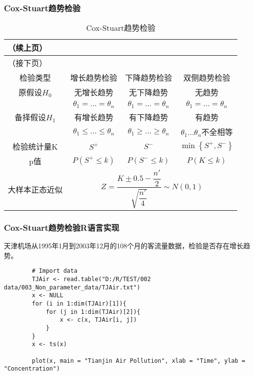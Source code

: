 \documentclass[UTF8]{ctexart}
\numberwithin{equation}{section}
\begin{document}
\subsubsection{Cox-Stuart趋势检验}

\begin{center}
    \begin{longtable}{cccc}
        \caption{Cox-Stuart趋势检验} \\ \toprule
        \endfirsthead
        \multicolumn{3}{l}{（续上页）} \\ \toprule
        \endhead
        \bottomrule
        \multicolumn{3}{l}{（接下页）} \\[2ex]
        \endfoot
        \bottomrule
        \endlastfoot
        检验类型 & 增长趋势检验 & 下降趋势检验 & 双侧趋势检验 \\
        \hline
        原假设$H_0$ & 无增长趋势 & 无下降趋势 & 无趋势 \\
         & $\theta_1 = \dots = \theta_n$ & $\theta_1 = \dots = \theta_n$ & $\theta_1 = \dots = \theta_n$ \\
        备择假设$H_1$ & 有增长趋势 & 有下降趋势 & 有趋势 \\
         & $\theta_1 \leq \dots \leq \theta_n$ & $\theta_1 \geq \dots \geq \theta_n$ & $\theta_1 \dots \theta_n$不全相等 \\
        检验统计量K & $S^+$ & $S^-$ & $\min{\left\{ S^+, S^- \right\}}$ \\
        p值 & $P(S^+ \leq k)$ & $P(S^- \leq k)$ & $P(K \leq k)$ \\
        大样本正态近似 & \multicolumn{3}{c}{$Z = \dfrac{K \pm 0.5 - \dfrac{n'}{2}}{\sqrt{\dfrac{n'}{4}}} \sim N(0,1)$} \\
    \end{longtable}
\end{center}

\subsubsection{Cox-Stuart趋势检验R语言实现}

天津机场从1995年1月到2003年12月的108个月的客流量数据，检验是否存在增长趋势。

\begin{center}
    \begin{lstlisting}
        # Import data
        TJAir <- read.table("D:/R/TEST/002 data/003_Non_parameter_data/TJAir.txt")
        x <- NULL
        for (i in 1:dim(TJAir)[1]){
            for (j in 1:dim(TJAir)[2]){
                x <- c(x, TJAir[i, j])
            }
        }
        x <- ts(x)

        plot(x, main = "Tianjin Air Pollution", xlab = "Time", ylab = "Concentration")
    \end{lstlisting}
\end{center}
\end{document}
